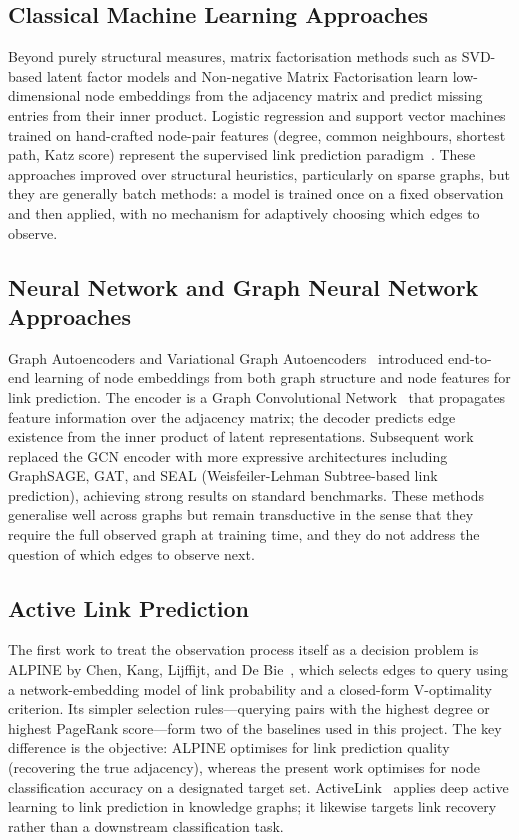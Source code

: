 \documentclass[11pt,a4paper]{article}
\newif\ifshowverify
\newcommand{\verify}{\ifshowverify\textcolor{red}{\textsuperscript{[verify]}}\fi}
\begin{document}
\subsection{Classical Machine Learning Approaches}

Beyond purely structural measures, matrix factorisation methods such as SVD-based latent
factor models and Non-negative Matrix Factorisation learn low-dimensional node embeddings
from the adjacency matrix and predict missing entries from their inner product. Logistic
regression and support vector machines trained on hand-crafted node-pair features (degree,
common neighbours, shortest path, Katz score) represent the supervised link prediction
paradigm~\cite{settles}. These approaches improved over structural heuristics, particularly
on sparse graphs, but they are generally batch methods: a model is trained once on a fixed
observation and then applied, with no mechanism for adaptively choosing which edges to observe.

\subsection{Neural Network and Graph Neural Network Approaches}

Graph Autoencoders and Variational Graph Autoencoders~\cite{kipf} introduced end-to-end
learning of node embeddings from both graph structure and node features for link prediction.
The encoder is a Graph Convolutional Network~\cite{kipf} that propagates feature information
over the adjacency matrix; the decoder predicts edge existence from the inner product of
latent representations. Subsequent work replaced the GCN encoder with more expressive
architectures including GraphSAGE, GAT, and SEAL (Weisfeiler-Lehman Subtree-based link
prediction), achieving strong results on standard benchmarks. These methods generalise well
across graphs but remain transductive in the sense that they require the full observed graph
at training time, and they do not address the question of which edges to observe next.

\subsection{Active Link Prediction}

The first work to treat the observation process itself as a decision problem is ALPINE by
Chen, Kang, Lijffijt, and De Bie~\cite{alpine}, which selects edges to query using a
network-embedding model of link probability and a closed-form V-optimality criterion\verify.
Its simpler selection rules---querying pairs with the highest degree or highest PageRank
score---form two of the baselines used in this project. The key difference is the objective:
ALPINE optimises for link prediction quality (recovering the true adjacency), whereas the
present work optimises for node classification accuracy on a designated target set.
ActiveLink~\cite{activelink} applies deep active learning to link prediction in knowledge
graphs\verify; it likewise targets link recovery rather than a downstream classification task.
\end{document}
